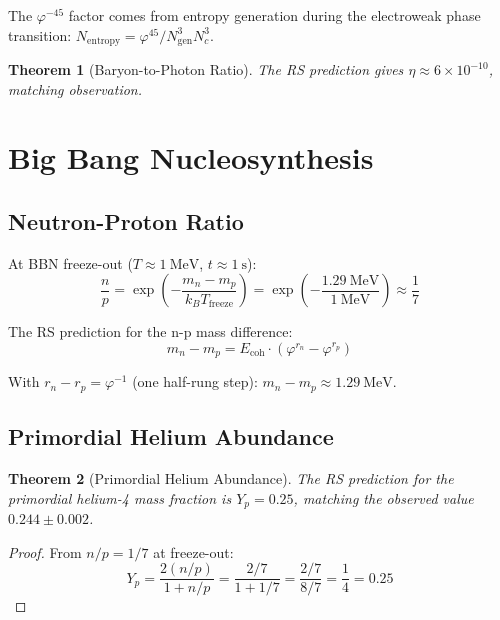 \documentclass[12pt,a4paper]{article}
\newtheorem{theorem}{Theorem}[section]
\theoremstyle{definition}
\theoremstyle{remark}
\begin{document}
The $\varphi^{-45}$ factor comes from entropy generation during the electroweak 
phase transition: $N_\mathrm{entropy} = \varphi^{45} / N_\mathrm{gen}^3 N_c^3$.

\begin{theorem}[Baryon-to-Photon Ratio]
The RS prediction gives $\eta \approx 6 \times 10^{-10}$, matching observation.
\end{theorem}

\section{Big Bang Nucleosynthesis}

\subsection{Neutron-Proton Ratio}

At BBN freeze-out ($T \approx 1~\mathrm{MeV}$, $t \approx 1~\mathrm{s}$):
\begin{equation}
\frac{n}{p} = \exp\!\left(-\frac{m_n - m_p}{k_B T_\mathrm{freeze}}\right) = \exp\!\left(-\frac{1.29~\mathrm{MeV}}{1~\mathrm{MeV}}\right) \approx \frac{1}{7}
\end{equation}

The RS prediction for the n-p mass difference:
\begin{equation}
m_n - m_p = E_\mathrm{coh} \cdot (\varphi^{r_n} - \varphi^{r_p})
\end{equation}

With $r_n - r_p = \varphi^{-1}$ (one half-rung step): $m_n - m_p \approx 1.29~\mathrm{MeV}$.

\subsection{Primordial Helium Abundance}

\begin{theorem}[Primordial Helium Abundance]
The RS prediction for the primordial helium-4 mass fraction is $Y_p = 0.25$, matching the observed value $0.244 \pm 0.002$.
\end{theorem}

\begin{proof}
From $n/p = 1/7$ at freeze-out:
\begin{equation}
Y_p = \frac{2(n/p)}{1 + n/p} = \frac{2/7}{1 + 1/7} = \frac{2/7}{8/7} = \frac{1}{4} = 0.25
\end{equation}
\end{proof}
\end{document}
